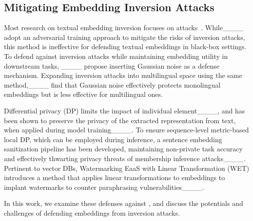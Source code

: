 \subsection{Mitigating Embedding Inversion Attacks}
Most research on textual embedding inversion focuses on attacks~\cite {li-etal-2023-sentence, huang_transferable_2024,chen2024typ}.
While____ adopt an adversarial training approach to mitigate the risks of inversion attacks, this method is ineffective for defending textual embeddings in black-box settings.
To defend against inversion attacks while maintaining embedding utility in downstream tasks, ____ propose inserting Gaussian noise as a defense mechanism.
Expanding inversion attacks into multilingual space using the same method,____ find that Gaussian noise effectively protects monolingual embeddings but is less effective for multilingual ones.

Differential privacy (DP) limits the impact of individual element____, and has been shown to preserve the privacy of the extracted representation from text, when applied during model training____.
To ensure sequence-level metric-based local DP, which can be employed during inference, a sentence embedding sanitization pipeline has been developed, maintaining non-private task accuracy and effectively thwarting privacy threats of membership inference attacks____.
Pertinent to vector DBs, Watermarking EaaS with Linear Transformation (WET) introduces a method that applies linear transformations to embeddings to implant watermarks to counter paraphrasing vulnerabilities____.

In this work, we examine these defenses against \textbf{\ourmethod}, and discuss the potentials and challenges of defending embeddings from inversion attacks.
